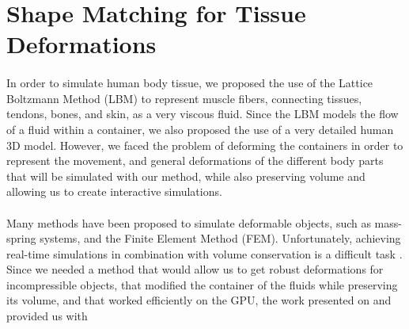 \section{Shape Matching for Tissue Deformations}
\label{SMTD}

\paragraph{}In order to simulate human body tissue, we proposed the use of the Lattice Boltzmann Method (LBM) to represent muscle fibers, connecting tissues, tendons, bones, and skin, as a very viscous fluid. Since the LBM models the flow of a fluid within a container, we also proposed the use of a very detailed human 3D model. However, we faced the problem of deforming the containers in order to represent the movement, and general deformations of the different body parts that will be simulated with our method, while also preserving volume and allowing us to create interactive simulations. 

\paragraph{}Many methods have been proposed to simulate deformable objects, such as mass-spring systems, and the Finite Element Method (FEM). Unfortunately, achieving real-time simulations in combination with volume conservation is a difficult task \citep{diziol2011robust}. Since we needed a method that would allow us to get robust deformations for incompressible objects, that modified the container of the fluids while preserving its volume, and that worked efficiently on the GPU, the work presented on \citep{muller2005meshless} and \citep{diziol2011robust} provided us with